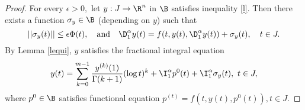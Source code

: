 \begin{proof}
For every $\epsilon>0,$ let $y:{J}\to{\R}^n$ in $\B$ satisfies inequality \eqref{l}. Then there exists a function $\sigma_y\in\B$ (depending on $y$) such that
\begin{equation*}
||\sigma_y(t)||\leq\epsilon\Phi(t),\quad \text{and}\quad \D_{1}^{\alpha}y(t)=f(t,y(t),{\D_{1}^{\alpha}y(t)})+\sigma_y(t),\quad t\in{J}.
\end{equation*}
By Lemma \ref{lequi}, $y$ satisfies the fractional integral equation
\begin{equation*}
y(t)=\sum_{k=0}^{m-1}\frac{y^{(k)}(1)}{\Gamma(k+1)}(\log{t})^k+{\I_{1}^{\alpha}}p^{0}(t)+{\I_{1}^{\alpha}}\sigma_{y}(t),\,\, t\in{J},
\end{equation*}
where $p^0\in\B$ satisfies functional equation $p^{(t)}=f(t,y(t),p^{0}(t)),t\in{J}.$


\end{proof}
